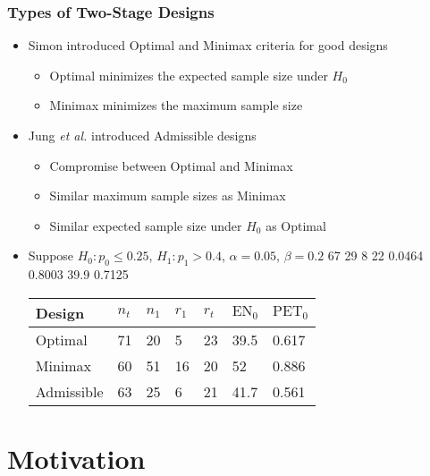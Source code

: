 \documentclass{beamer}\usepackage[]{graphicx}\usepackage[]{color}
\begin{document}
\begin{frame}
\frametitle{Types of Two-Stage Designs}
    \begin{itemize}
        \item Simon introduced Optimal and Minimax criteria for good designs
          \begin{itemize}
             \item Optimal minimizes the expected sample size under $H_0$
             \item Minimax minimizes the maximum sample size 
          \end{itemize}
        \item Jung \textit{et al.} introduced Admissible designs
            \begin{itemize}
              \item Compromise between Optimal and Minimax
              \item Similar maximum sample sizes as Minimax
              \item Similar expected sample size under $H_0$ as Optimal
            \end{itemize}
        \item Suppose $H_0: p_0 \leq 0.25$, $H_1: p_1 > 0.4$, $\alpha = 0.05$, $\beta = 0.2$
        67	29	8	22	0.0464	0.8003	39.9	0.7125
\begin{table}[]
\centering
\begin{tabular}{l|llllll}
Design     & $n_t$ & $n_1$ & $r_1$ & $r_t$ & $\mbox{EN}_0$    & $\mbox{PET}_0$ \\ \hline
Optimal    & 71      &  20     &   5    &   23    &      39.5      &    0.617            \\
Minimax    &  60     &  51     &   16    &   20    &    52          &      0.886          \\
Admissible &  63     &   25    &   6    &   21    &     41.7     &     0.561          
\end{tabular}
\end{table}
    \end{itemize}
\end{frame}


\section{Motivation}
\end{document}
